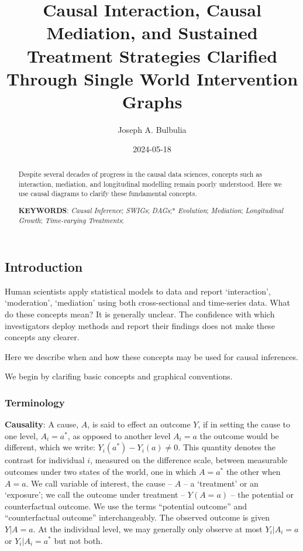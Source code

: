 \documentclass[
  single column]{article}
\title{Causal Interaction, Causal Mediation, and Sustained Treatment
Strategies Clarified Through Single World Intervention Graphs}
\author{Joseph A. Bulbulia}
\affil{%
             \small{     Victoria University of Wellington, New Zealand
          ORCID \textcolor[HTML]{A6CE39}{\aiOrcid} ~0000-0002-5861-2056 }
              }
\date{2024-05-18}
\begin{document}
\maketitle
\begin{abstract}
Despite several decades of progress in the causal data sciences,
concepts such as interaction, mediation, and longitudinal modelling
remain poorly understood. Here we use causal diagrams to clarify these
fundamental concepts.

\textbf{KEYWORDS}: \emph{Causal Inference}; \emph{SWIGs}; \emph{DAGs};*
\emph{Evolution}; \emph{Mediation}; \emph{Longitudinal Growth};
\emph{Time-varying Treatments};
\end{abstract}

\subsection{Introduction}\label{introduction}

Human scientists apply statistical models to data and report
`interaction', `moderation', `mediation' using both cross-sectional and
time-series data. What do these concepts mean? It is generally unclear.
The confidence with which investigators deploy methods and report their
findings does not make these concepts any clearer.

Here we describe when and how these concepts may be used for causal
inferences.

We begin by clarifing basic concepts and graphical conventions.

\subsubsection{Terminology}\label{terminology}

\textbf{Causality}: A cause, \(A\), is said to effect an outcome \(Y\),
if in setting the cause to one level, \(A_i = a^*\), as opposed to
another level \(A_i = a\) the outcome would be different, which we
write: \(Y_i(a^*) -  Y_i(a) \neq 0\). This quantity denotes the contrast
for individual \(i\), measured on the difference scale, between
measurable outcomes under two states of the world, one in which
\(A = a^*\) the other when \(A=a\). We call variable of interest, the
cause -- \(A\) -- a `treatment' or an `exposure'; we call the outcome
under treatment -- \(Y(A = a)\) -- the potential or counterfactual
outcome. We use the terms ``potential outcome'' and ``counterfactual
outcome'' interchangeably. The observed outcome is given \(Y|A=a\). At
the individual level, we may generally only observe at most
\(Y_i|A_i =a\) or \(Y_i|A_i =a^*\) but not both.
\end{document}
